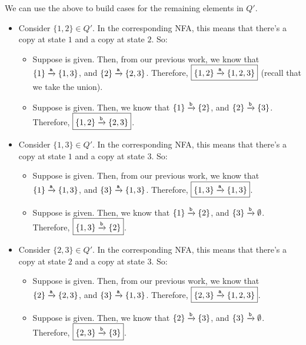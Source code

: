 \documentclass[letterpaper]{article}
\begin{document}
We can use the above to build cases for the remaining elements in $Q'$.
\begin{itemize}
    \item Consider $\{1, 2\} \in Q'$. In the corresponding NFA, this means that there's a copy at state $1$ and a copy at state $2$. So: 
    \begin{itemize}
        \item Suppose  is given. Then, from our previous work, we know that $\{1\} \xrightarrow{\texttt{a}} \{1, 3\}$, and $\{2\} \xrightarrow{\texttt{a}} \{2, 3\}$.
        Therefore, $\boxed{\{1, 2\} \xrightarrow{\texttt{a}} \{1, 2, 3\}}$ (recall that we take the union).
        \item Suppose  is given. Then, we know that $\{1\} \xrightarrow{\texttt{b}} \{2\}$, and $\{2\} \xrightarrow[]{\texttt{b}} \{3\}$. Therefore, $\boxed{\{1, 2\} \xrightarrow[]{\texttt{b}} \{2, 3\}}$. 
    \end{itemize}
    
    \item Consider $\{1, 3\} \in Q'$. In the corresponding NFA, this means that there's a copy at state $1$ and a copy at state $3$. So: 
    \begin{itemize}
        \item Suppose  is given. Then, from our previous work, we know that $\{1\} \xrightarrow{\texttt{a}} \{1, 3\}$, and $\{3\} \xrightarrow{\texttt{a}} \{1, 3\}$.
        Therefore, $\boxed{\{1, 3\} \xrightarrow{\texttt{a}} \{1, 3\}}$.
        \item Suppose  is given. Then, we know that $\{1\} \xrightarrow{\texttt{b}} \{2\}$, and $\{3\} \xrightarrow[]{\texttt{b}} \emptyset$. Therefore, $\boxed{\{1, 3\} \xrightarrow[]{\texttt{b}} \{2\}}$. 
    \end{itemize}
    
    \item Consider $\{2, 3\} \in Q'$. In the corresponding NFA, this means that there's a copy at state $2$ and a copy at state $3$. So: 
    \begin{itemize}
        \item Suppose  is given. Then, from our previous work, we know that $\{2\} \xrightarrow{\texttt{a}} \{2, 3\}$, and $\{3\} \xrightarrow{\texttt{a}} \{1, 3\}$.
        Therefore, $\boxed{\{2, 3\} \xrightarrow{\texttt{a}} \{1, 2, 3\}}$.
        \item Suppose  is given. Then, we know that $\{2\} \xrightarrow{\texttt{b}} \{3\}$, and $\{3\} \xrightarrow[]{\texttt{b}} \emptyset$. Therefore, $\boxed{\{2, 3\} \xrightarrow[]{\texttt{b}} \{3\}}$. 
    \end{itemize}


\end{itemize}
\end{document}
